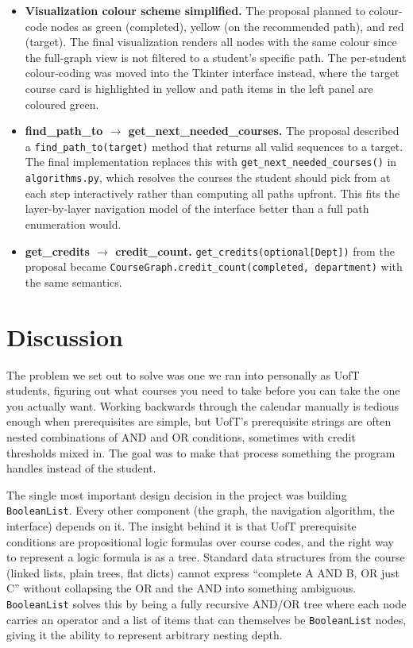 \documentclass[11pt]{article}
\begin{document}
\begin{itemize}
    \item \textbf{Visualization colour scheme simplified.} The proposal planned to
    colour-code nodes as green (completed), yellow (on the recommended path), and red
    (target). The final visualization renders all nodes with the same colour since the
    full-graph view is not filtered to a student's specific path. The per-student
    colour-coding was moved into the Tkinter interface instead, where the target course card
    is highlighted in yellow and path items in the left panel are coloured green.

    \item \textbf{find\_path\_to $\rightarrow$ get\_next\_needed\_courses.} The proposal
    described a \verb|find_path_to(target)| method that returns all valid sequences to a
    target. The final implementation replaces this with \verb|get_next_needed_courses()| in
    \verb|algorithms.py|, which resolves the courses the student should pick from at each
    step interactively rather than computing all paths upfront. This fits the layer-by-layer
    navigation model of the interface better than a full path enumeration would.

    \item \textbf{get\_credits $\rightarrow$ credit\_count.} \verb|get_credits(optional[Dept])|
    from the proposal became \verb|CourseGraph.credit_count(completed, department)| with the
    same semantics.

\end{itemize}

\section*{Discussion}

The problem we set out to solve was one we ran into personally as UofT students, figuring
out what courses you need to take before you can take the one you actually want. Working
backwards through the calendar manually is tedious enough when prerequisites are simple, but
UofT's prerequisite strings are often nested combinations of AND and OR conditions, sometimes
with credit thresholds mixed in. The goal was to make that process something the program
handles instead of the student.

The single most important design decision in the project was building \verb|BooleanList|.
Every other component (the graph, the navigation algorithm, the interface) depends on
it. The insight behind it is that UofT prerequisite conditions are propositional logic
formulas over course codes, and the right way to represent a logic formula is as a tree.
Standard data structures from the course (linked lists, plain trees, flat dicts) cannot
express ``complete A AND B, OR just C'' without collapsing the OR and the AND into something
ambiguous. \verb|BooleanList| solves this by being a fully recursive AND/OR tree where each
node carries an operator and a list of items that can themselves be \verb|BooleanList| nodes,
giving it the ability to represent arbitrary nesting depth.
\end{document}
